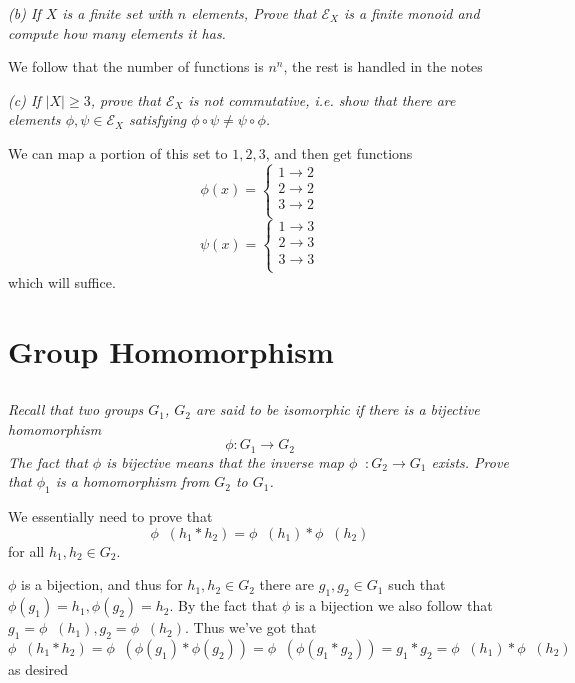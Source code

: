 \documentclass[11pt,oneside,titlepage]{book}
\DeclareMathOperator \inv {^{-1}}
\begin{document}
\textit{(b) If $X$ is a finite set with $n$ elements, Prove that
$\mathcal{E}_X$ is a finite monoid and compute how many elements it
has.}

We follow that the number of functions is $n^n$, the rest is handled
in the notes

\textit{(c) If $|X| \geq 3$, prove that $\mathcal{E}_X$ is not
commutative, i.e.  show that there are elements $\phi, \psi \in
\mathcal{E}_X$ satisfying $\phi \circ \psi \neq \psi \circ \phi$.}

We can map a portion of this set to ${1, 2, 3}$, and then get
functions
$$\phi(x) =
\begin{cases} 1 \to 2 \\ 2 \to 2 \\ 3 \to 2 \\
\end{cases}
$$
$$\psi(x) =
\begin{cases} 1 \to 3 \\ 2 \to 3 \\ 3 \to 3 \\
\end{cases}
$$
which will suffice.

\section{Group Homomorphism}

\subsection{}

\textit{Recall that two groups $G_1$, $G_2$ are said to be isomorphic
if there is a bijective homomorphism
  $$\phi: G_1 \to G_2$$
  The fact that $\phi$ is bijective means that the inverse map $\phi
\inv : G_2 \to G_1$ exists.  Prove that $\phi_1$ is a homomorphism
from $G_2$ to $G_1$.  }

We essentially need to prove that
$$\phi\inv(h_1 * h_2) = \phi \inv (h_1) * \phi \inv (h_2)$$
for all $h_1, h_2 \in G_2$.

$\phi$ is a bijection, and thus for $h_1, h_2 \in G_2$ there are $g_1,
g_2 \in G_1$ such that $\phi(g_1) = h_1, \phi(g_2) = h_2$. By the fact
that $\phi$ is a bijection we also follow that $g_1 = \phi\inv(h_1),
g_2 = \phi\inv(h_2)$. Thus we've got that
$$\phi\inv(h_1 * h_2) = \phi\inv(\phi(g_1) * \phi(g_2)) =
\phi\inv(\phi(g_1 * g_2)) = g_1 * g_2 = \phi\inv(h_1) *
\phi\inv(h_2) $$ as desired

\subsection{}
\end{document}
